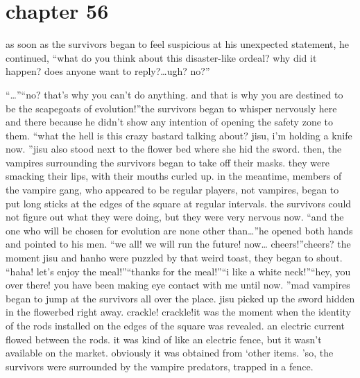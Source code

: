 \section{chapter 56}

                            as soon as the survivors began to feel suspicious at his unexpected statement, he continued, “what do you think about this disaster-like ordeal? why did it happen? does anyone want to reply?…ugh? no?”




“…”“no? that’s why you can’t do anything.
 and that is why you are destined to be the scapegoats of evolution!”the survivors began to whisper nervously here and there because he didn’t show any intention of opening the safety zone to them.
“what the hell is this crazy bastard talking about? jisu, i’m holding a knife now.
”jisu also stood next to the flower bed where she hid the sword.
 then, the vampires surrounding the survivors began to take off their masks.
 they were smacking their lips, with their mouths curled up.
in the meantime, members of the vampire gang, who appeared to be regular players, not vampires, began to put long sticks at the edges of the square at regular intervals.
the survivors could not figure out what they were doing, but they were very nervous now.
“and the one who will be chosen for evolution are none other than…”he opened both hands and pointed to his men.
“we all! we will run the future! now… cheers!”cheers? the moment jisu and hanho were puzzled by that weird toast, they began to shout.
“haha! let’s enjoy the meal!”“thanks for the meal!”“i like a white neck!”“hey, you over there! you have been making eye contact with me until now.
”mad vampires began to jump at the survivors all over the place.
 jisu picked up the sword hidden in the flowerbed right away.
crackle! crackle!it was the moment when the identity of the rods installed on the edges of the square was revealed.
 an electric current flowed between the rods.
 it was kind of like an electric fence, but it wasn’t available on the market.
 obviously it was obtained from ‘other items.
’so, the survivors were surrounded by the vampire predators, trapped in a fence.

